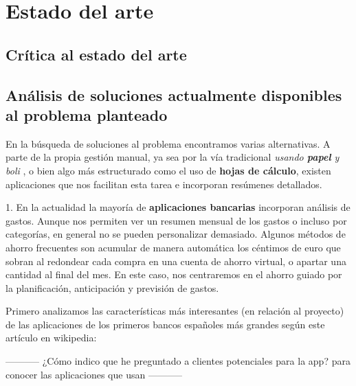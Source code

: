 \chapter{Estado del arte}
\section{Crítica al estado del arte}

\section{Análisis de soluciones actualmente disponibles al problema planteado}
En la búsqueda de soluciones al problema encontramos varias alternativas. A parte 
de la propia gestión manual, ya sea por la vía tradicional \textit{usando \textbf{papel} y boli} , 
o bien algo más estructurado como el uso de \textbf{hojas de cálculo}, existen aplicaciones 
que nos facilitan esta tarea e incorporan resúmenes detallados. 

1. En la actualidad la mayoría de \textbf{aplicaciones bancarias} incorporan análisis de gastos. 
Aunque nos permiten ver un resumen mensual de los gastos o incluso por categorías, en 
general no se pueden personalizar demasiado. Algunos métodos de ahorro frecuentes son acumular 
de manera automática los céntimos de euro que sobran al redondear cada compra en una cuenta 
de ahorro virtual, o apartar una cantidad al final del mes. En este caso, nos centraremos 
en el ahorro guiado por la planificación, anticipación y previsión de gastos.

Primero analizamos las características más interesantes (en relación al proyecto) 
de las aplicaciones de los primeros bancos españoles más grandes según 
este\cite{este} artículo en wikipedia:

-----------
¿Cómo indico que he preguntado a clientes potenciales para la app? para 
conocer las aplicaciones que usan
-----------


